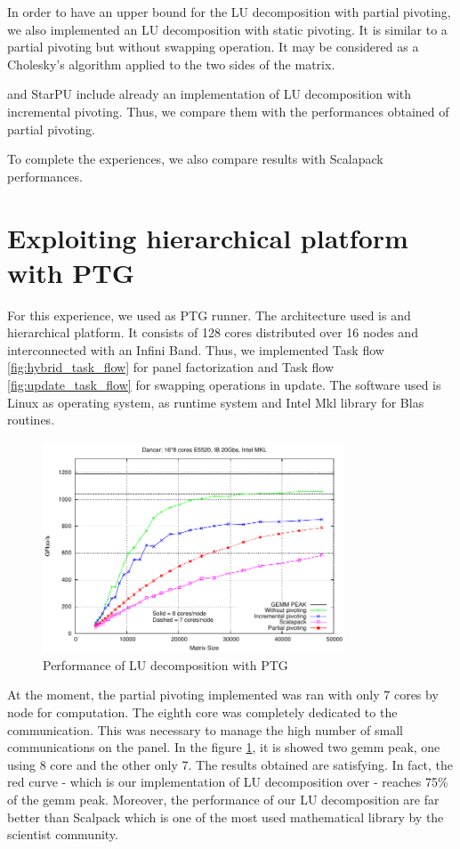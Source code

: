 In order to have an upper bound for the LU decomposition with partial pivoting, we also implemented an LU decomposition with static pivoting. It is similar to a partial pivoting but without swapping operation. It may be considered as a Cholesky's algorithm applied to the two sides of the matrix.

\dague and StarPU include already an implementation of LU decomposition with incremental pivoting. Thus, we compare them with the performances obtained of partial pivoting.

To complete the experiences, we also compare results with Scalapack performances.

\section{Exploiting hierarchical platform with PTG}
For this experience, we used \dague as PTG runner. The architecture used is and hierarchical platform. It consists of 128 cores distributed over 16 nodes and interconnected with an Infini Band. Thus, we implemented Task flow \ref{fig:hybrid_task_flow} for panel factorization and Task flow \ref{fig:update_task_flow} for swapping operations in update. The software used is Linux as operating system, \dague as runtime system and Intel Mkl library for Blas routines.

\begin{figure}
\centering
\includegraphics[width=0.8\textwidth]{figures/gepp.pdf}
\caption{Performance of LU decomposition with PTG\label{fig:pp}} 
\end{figure}

At the moment, the partial pivoting implemented was ran with only 7 cores by node for computation. The eighth core was completely dedicated to the communication. This was necessary to manage the high number of small communications on the panel. In the figure \ref{fig:pp}, it is showed two gemm peak, one using 8 core and the other only 7. The results obtained are satisfying. In fact,  the red curve - which is our implementation of LU decomposition over \dague - reaches 75\% of the gemm peak. Moreover, the performance of our LU decomposition are far better than Scalpack which is one of the most used mathematical library by the scientist community. 

